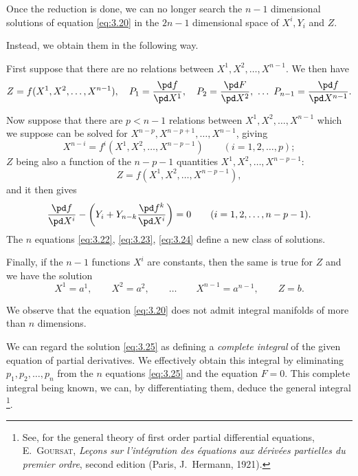 Once the reduction is done, we can no longer search the $n-1$ dimensional solutions of equation \eqref{eq:3.20} in the $2n-1$ dimensional space of $X^{i},Y_{i}$ and $Z$.

Instead, we obtain them in the following way.

First suppose that there are no relations between $X^{1},X^{2},\dots,X^{n-1}$. We then have
\begin{equation}
  \label{eq:3.21}
  Z=f(X^{1},X^{2},\dots,X^{n-1}),\quad P_{1}=\frac{\pd f}{\pd X^{1}},\quad P_{2}=\frac{\pd F}{\pd X^{2}},\ \dots\ P_{n-1}=\frac{\pd f}{\pd X^{n-1}}.
\end{equation}

Now suppose that there are $p<n-1$ relations between $X^{1},X^{2},\dots,X^{n-1}$ which we suppose can be solved for $X^{n-p},X^{n-p+1},\dots,X^{n-1}$, giving
\begin{equation}
  \label{eq:3.22}
  X^{n-i}=f^{i}(X^{1},X^{2},\dots,X^{n-p-1})\qquad (i=1,2,\dots,p);
\end{equation}
$Z$ being also a function of the $n-p-1$ quantities $X^{1},X^{2},\dots,X^{n-p-1}$:
\begin{equation}
  \label{eq:3.23}
  Z=f(X^{1},X^{2},\dots,X^{n-p-1}),
\end{equation}
and it then gives
\begin{equation}
  \label{eq:3.24}
  \frac{\pd f}{\pd X^{i}}-\left(Y_{i}+Y_{n-k}\frac{\pd f^{k}}{\pd X^{i}}\right)=0\qquad(i=1,2,\dots,n-p-1).
\end{equation}
The $n$ equations \eqref{eq:3.22}, \eqref{eq:3.23}, \eqref{eq:3.24} define a new class of solutions.

Finally, if the $n-1$ functions $X^{i}$ are constants, then the same is true for $Z$ and we have the solution
\begin{equation}
  \label{eq:3.25}
  X^{1}=a^{1},\qquad X^{2}=a^{2},\qquad\dots\qquad X^{n-1}=a^{n-1},\qquad Z=b.
\end{equation}

We observe that the equation \eqref{eq:3.20} does not admit integral manifolds of more than $n$ dimensions.

We can regard the solution \eqref{eq:3.25} as defining a \emph{complete integral} of the given equation of partial derivatives. We effectively obtain this integral by eliminating $p_{1},p_{2},\dots,p_{n}$ from the $n$ equations \eqref{eq:3.25} and the equation $F=0$. This complete integral being known, we can, by differentiating them, deduce the general integral \footnote{See, for the general theory of first order partial differential equations, \textsc{E.~Goursat}, \emph{Le\c{c}ons sur l'int\'egration des \'equations aux d\'eriv\'ees partielles du premier ordre}, second edition (Paris, J.~Hermann, 1921).}.

